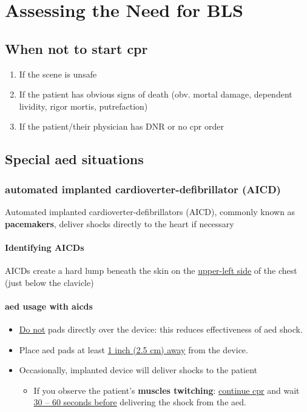 \documentclass[../../EMT-169.tex]{subfiles}
\begin{document}
\section{Assessing the Need for BLS}
\subsection{When not to start \acrshort{cpr}}
\begin{enumerate}
	\item If the scene is unsafe
	\item If the patient has obvious signs of death (obv. mortal damage, dependent lividity, rigor mortis, putrefaction)
	\item If the patient/their physician has DNR or no \acrshort{cpr} order
\end{enumerate}

\subsection{Special \acrshort{aed} situations}
\subsubsection{automated implanted cardioverter-defibrillator (AICD)} 
Automated implanted cardioverter-defibrillators (AICD), commonly known as \textbf{pacemakers}, deliver shocks directly to the heart if necessary 
\paragraph{Identifying AICDs} AICDs create a hard lump beneath the skin on the \underline{upper-left side} of the chest (just below the clavicle)
\paragraph{\acrshort{aed} usage with \acrshort{aicd}s} 
\begin{itemize}
	\item[] \underline{Do not} pads directly over the device: this reduces effectiveness of \acrshort{aed} shock.
	\item Place \acrshort{aed} pads at least \underline{1 inch (2.5 cm) away} from the device.
	\item Occasionally, implanted device will deliver shocks to the patient 
	\begin{itemize} 
		\item If you observe the patient's \textbf{muscles twitching}: \newline
		\underline{continue \acrshort{cpr}} and wait \underline{30 -- 60 seconds before} delivering the shock from the \acrshort{aed}.
	\end{itemize}
\end{itemize}
\end{document}
